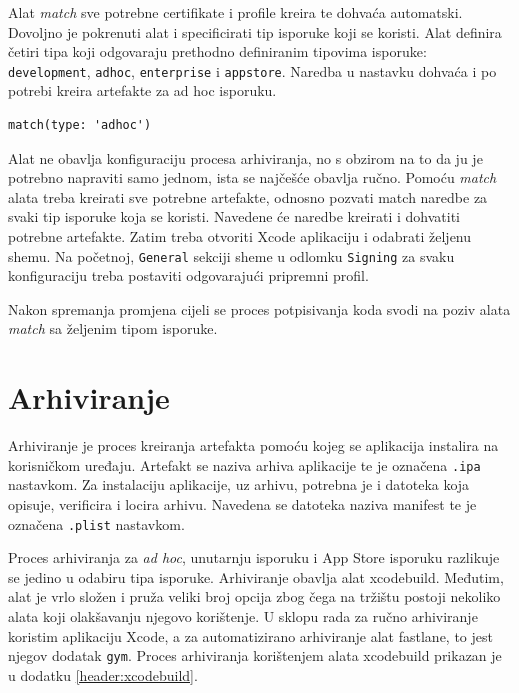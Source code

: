 \documentclass[times, utf8, diplomski, numeric]{fer}
\begin{document}
Alat \textit{match} sve potrebne certifikate i profile kreira te dohvaća automatski. Dovoljno je pokrenuti alat i specificirati tip isporuke koji se koristi. Alat definira četiri tipa koji odgovaraju prethodno definiranim tipovima isporuke: \verb|development|, \verb|adhoc|, \verb|enterprise| i \verb|appstore|. Naredba u nastavku dohvaća i po potrebi kreira artefakte za ad hoc isporuku.

\begin{lstlisting}[caption=Dohvćanje artefakta pomoću dodatka match za ad hoc isporuku]
match(type: 'adhoc')
\end{lstlisting}

Alat ne obavlja konfiguraciju procesa arhiviranja, no s obzirom na to da ju je potrebno napraviti samo jednom, ista se najčešće obavlja ručno. Pomoću \textit{match} alata treba kreirati sve potrebne artefakte, odnosno pozvati match naredbe za svaki tip isporuke koja se koristi. Navedene će naredbe kreirati i dohvatiti potrebne artefakte. Zatim treba otvoriti Xcode aplikaciju i odabrati željenu shemu. Na početnoj, \verb|General| sekciji sheme u odlomku \verb|Signing| za svaku konfiguraciju treba postaviti odgovarajući pripremni profil.

Nakon spremanja promjena cijeli se proces potpisivanja koda svodi na poziv alata \textit{match} sa željenim tipom isporuke.


\section{Arhiviranje} \label{header:RucnaIsporuka}

Arhiviranje je proces kreiranja artefakta pomoću kojeg se aplikacija instalira na korisničkom uređaju. Artefakt se naziva arhiva aplikacije te je označena \verb|.ipa| nastavkom. Za instalaciju aplikacije, uz arhivu, potrebna je i datoteka koja opisuje, verificira i locira arhivu. Navedena se datoteka naziva manifest te je označena \verb|.plist| nastavkom.

Proces arhiviranja za \textit{ad hoc}, unutarnju isporuku i App Store isporuku razlikuje se jedino u odabiru tipa isporuke. Arhiviranje obavlja alat xcodebuild. Međutim, alat je vrlo složen i pruža veliki broj opcija zbog čega na tržištu postoji nekoliko alata koji olakšavanju njegovo korištenje. U sklopu rada za ručno arhiviranje koristim aplikaciju Xcode, a za automatizirano arhiviranje alat fastlane, to jest njegov dodatak \verb|gym|. Proces arhiviranja korištenjem alata xcodebuild prikazan je u dodatku \ref{header:xcodebuild}.
\end{document}
